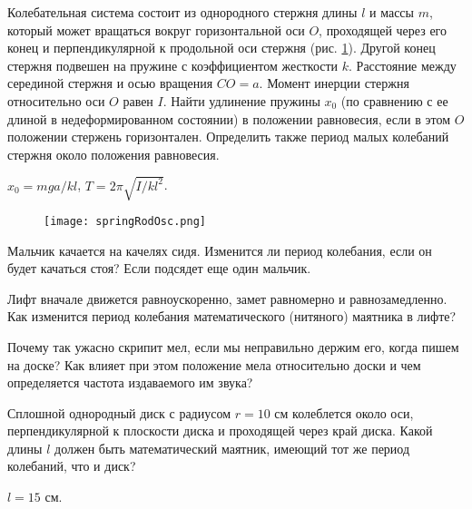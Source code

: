 \begin{ex} %
Колебательная система состоит из однородного стержня длины $l$ и массы $m$, который может вращаться вокруг горизонтальной оси $O$, проходящей через его конец и перпендикулярной к продольной оси стержня (рис. \ref{springRodOsc}). Другой конец стержня подвешен на пружине с коэффициентом жесткости $k$. Расстояние между серединой стержня и осью вращения $CO = a$. Момент инерции стержня относительно оси $O$ равен $I$. Найти удлинение пружины $x_0$ (по сравнению с ее длиной в недеформированном состоянии) в положении равновесия, если в этом $O$ положении стержень горизонтален. Определить также период малых колебаний стержня около положения равновесия.
\begin{ans}
$x_0 = mga/kl$, $T = 2 \pi \sqrt{I/kl^2}$.
\end{ans}
\end{ex}	

\begin{figure}[h]
\centering
\texttt{[image: springRodOsc.png]}
\caption{}
\label{springRodOsc}
\end{figure}

\qualProblems

\begin{ex}
Мальчик качается на качелях сидя. Изменится ли период колебания, если он будет качаться стоя? Если подсядет еще один мальчик.
\end{ex}	

\begin{ex}
Лифт вначале движется равноускоренно, замет равномерно и равнозамедленно. Как изменится период колебания математического (нитяного) маятника в лифте?
\end{ex}	

\begin{ex}
Почему так ужасно скрипит мел, если мы неправильно держим его, когда пишем на доске? Как влияет при этом положение мела относительно доски и чем определяется частота издаваемого им звука?
\end{ex}	

\simpleProblems

\begin{ex} %
Сплошной однородный диск с радиусом $r = 10$ см колеблется около оси, перпендикулярной к плоскости диска и проходящей через край диска. Какой длины $l$ должен быть математический маятник, имеющий тот же период колебаний, что и диск?
\begin{ans}
$l = 15$ см.
\end{ans}
\end{ex}	

